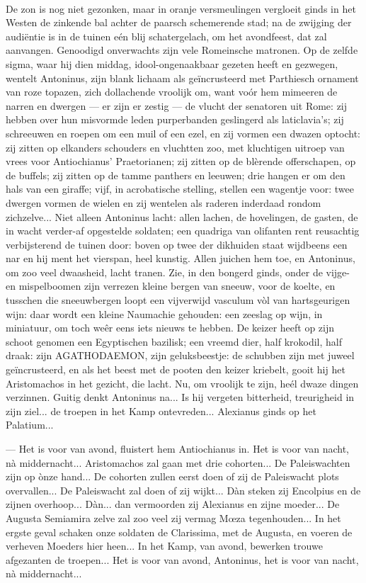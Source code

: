 \documentclass[a4paper, 12pt, oneside, dutch]{article}
\begin{document}
\paragraph{}
De zon is nog niet gezonken, maar in oranje versmeulingen vergloeit ginds in het Westen de zinkende bal achter de paarsch schemerende stad; na de zwijging der audiëntie is in de tuinen eén blij schatergelach, om het avondfeest, dat zal aanvangen. Genoodigd onverwachts zijn vele Romeinsche matronen. Op de zelfde sigma, waar hij dien middag, idool-ongenaakbaar gezeten heeft en gezwegen, wentelt Antoninus, zijn blank lichaam als geïncrusteerd met Parthiesch ornament van roze topazen, zich dollachende vroolijk om, want voór hem mimeeren de narren en dwergen --- er zijn er zestig --- de vlucht der senatoren uit Rome: zij hebben over hun misvormde leden purperbanden geslingerd als laticlavia's; zij schreeuwen en roepen om een muil of een ezel, en zij vormen een dwazen optocht: zij zitten op elkanders schouders en vluchtten zoo, met kluchtigen uitroep van vrees voor Antiochianus' Praetorianen; zij zitten op de blèrende offerschapen, op de buffels; zij zitten op de tamme panthers en leeuwen; drie hangen er om den hals van een giraffe; vijf, in acrobatische stelling, stellen een wagentje voor: twee dwergen vormen de wielen en zij wentelen als raderen inderdaad rondom zichzelve... Niet alleen Antoninus lacht: allen lachen, de hovelingen, de gasten, de in wacht verder-af opgestelde soldaten; een quadriga van olifanten rent reusachtig verbijsterend de tuinen door: boven op twee der dikhuiden staat wijdbeens een nar en hij ment het vierspan, heel kunstig. Allen juichen hem toe, en Antoninus, om zoo veel dwaasheid, lacht tranen. Zie, in den bongerd ginds, onder de vijge- en mispelboomen zijn verrezen kleine bergen van sneeuw, voor de koelte, en tusschen die sneeuwbergen loopt een vijverwijd vasculum vòl van hartsgeurigen wijn: daar wordt een kleine Naumachie gehouden: een zeeslag op wijn, in miniatuur, om toch weêr eens iets nieuws te hebben. De keizer heeft op zijn schoot genomen een Egyptischen bazilisk; een vreemd dier, half krokodil, half draak: zijn AGATHODAEMON, zijn geluksbeestje: de schubben zijn met juweel geïncrusteerd, en als het beest met de pooten den keizer kriebelt, gooit hij het Aristomachos in het gezicht, die lacht. Nu, om vroolijk te zijn, heél dwaze dingen verzinnen. Guitig denkt Antoninus na... Is hij vergeten bitterheid, treurigheid in zijn ziel... de troepen in het Kamp ontevreden... Alexianus ginds op het Palatium...

--- Het is voor van avond, fluistert hem Antiochianus in. Het is voor van nacht, nà middernacht... Aristomachos zal gaan met drie cohorten... De Paleiswachten zijn op ònze hand... De cohorten zullen eerst doen of zij de Paleiswacht plots overvallen... De Paleiswacht zal doen of zij wijkt... Dàn steken zij Encolpius en de zijnen overhoop... Dàn... dan vermoorden zij Alexianus en zijne moeder... De Augusta Semiamira zelve zal zoo veel zij vermag Mœza tegenhouden... In het ergste geval schaken onze soldaten de Clarissima, met de Augusta, en voeren de verheven Moeders hier heen... In het Kamp, van avond, bewerken trouwe afgezanten de troepen... Het is voor van avond, Antoninus, het is voor van nacht, nà middernacht...
\end{document}
